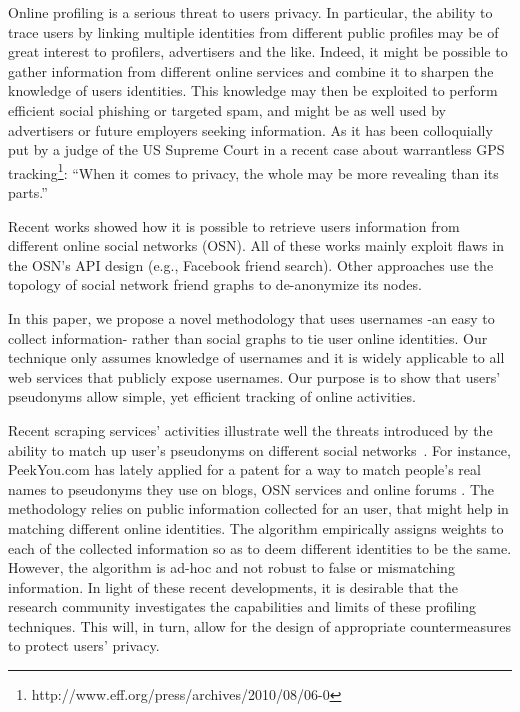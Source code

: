 \documentclass[letterpaper]{sig-alternate}
\begin{document}
Online profiling is a serious threat to users privacy. In particular, the
ability to trace users by linking multiple identities from different public
profiles may be of great interest to profilers, advertisers and the like. Indeed,
it might be possible to gather information from different online services and combine it
to sharpen the knowledge of users identities. This knowledge may then be exploited
to perform efficient social phishing or targeted spam, and might be as well
used by advertisers or future employers seeking information.  As it has been
colloquially put by a judge of the US Supreme Court in a recent case about
warrantless GPS
tracking\footnote{http://www.eff.org/press/archives/2010/08/06-0}: ``When it
comes to privacy, the whole may be more revealing than its parts.''

Recent works \cite{www2009,RAID} showed how it is possible to retrieve
users information from different online social networks (OSN). 
All of these works mainly exploit flaws in the OSN's API
design  (e.g., Facebook friend search).
Other approaches \cite{deanonymizingSP09} use the topology of
social network friend graphs to de-anonymize its nodes.

In this paper, we propose a novel methodology that uses 
usernames -an easy to collect information- rather than social graphs to tie user online identities. 
Our technique only assumes knowledge of usernames and it is widely applicable to all web
services that publicly expose usernames.
Our purpose is to show that users' pseudonyms allow simple, yet efficient tracking of online activities.

Recent scraping services' activities illustrate well the threats introduced by
the ability to match up user's pseudonyms on different social
networks~\cite{link_to_nielsen}. For instance, PeekYou.com has lately
applied for a patent for a way to match people's real names to
pseudonyms they use on blogs, OSN services and online forums
\cite{Agrgregatorpatent}. The methodology relies on
public information collected for an user, that might help in matching different
online identities. The algorithm empirically assigns weights to each of the
collected information so as to deem different identities to be the same.
However, the algorithm is ad-hoc and not robust to false or mismatching information.
In light of these recent developments, it is desirable that the research community
investigates the capabilities and limits of these profiling techniques.
This will, in turn, allow for the design of appropriate countermeasures to
protect users' privacy.
\end{document}
